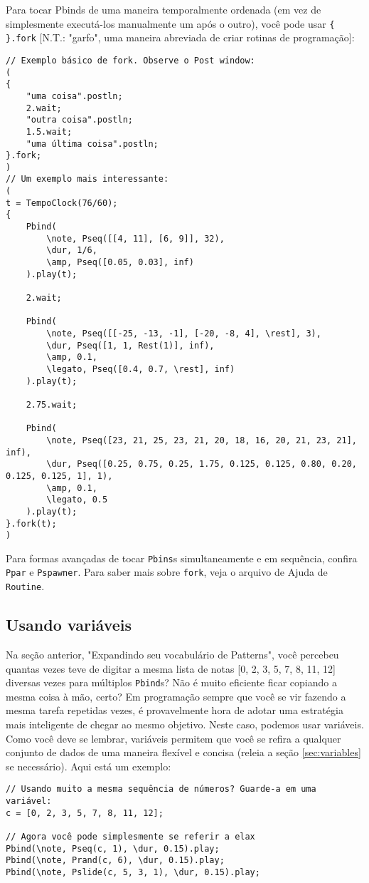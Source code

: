 Para tocar Pbinds de uma maneira temporalmente ordenada (em vez de simplesmente executá-los manualmente um após o outro), você pode usar \texttt{\{ \}.fork} [N.T.: "garfo", uma maneira abreviada de criar rotinas de programação]:

\begin{lstlisting}[style=SuperCollider-IDE, basicstyle=\scttfamily\footnotesize]
// Exemplo básico de fork. Observe o Post window:
( 
{
	"uma coisa".postln;
	2.wait;
	"outra coisa".postln;
	1.5.wait;
	"uma última coisa".postln;
}.fork;
)
// Um exemplo mais interessante:
(
t = TempoClock(76/60);
{
	Pbind(
		\note, Pseq([[4, 11], [6, 9]], 32),
		\dur, 1/6,
		\amp, Pseq([0.05, 0.03], inf)
	).play(t);
	
	2.wait;
	
	Pbind(
		\note, Pseq([[-25, -13, -1], [-20, -8, 4], \rest], 3),
		\dur, Pseq([1, 1, Rest(1)], inf),
		\amp, 0.1,
		\legato, Pseq([0.4, 0.7, \rest], inf)
	).play(t);

	2.75.wait;
	
	Pbind(
		\note, Pseq([23, 21, 25, 23, 21, 20, 18, 16, 20, 21, 23, 21], inf),
		\dur, Pseq([0.25, 0.75, 0.25, 1.75, 0.125, 0.125, 0.80, 0.20, 0.125, 0.125, 1], 1),
		\amp, 0.1,
		\legato, 0.5
	).play(t);
}.fork(t);
)
\end{lstlisting}
 
Para formas avançadas de tocar \texttt{Pbins}s simultaneamente e em sequência, confira \texttt{Ppar} e \texttt{Pspawner}. Para saber mais sobre \texttt{fork}, veja o arquivo de Ajuda de  \texttt{Routine}.

\subsection{Usando variáveis}

Na seção anterior, "Expandindo seu vocabulário de Patterns", você percebeu quantas vezes teve de digitar a mesma lista de notas [0, 2, 3, 5, 7, 8, 11, 12] diversas vezes para múltiplos \texttt{Pbind}s? Não é muito eficiente ficar copiando a mesma coisa à mão, certo? Em programação sempre que você se vir fazendo a mesma tarefa repetidas vezes, é provavelmente hora de adotar uma estratégia mais inteligente de chegar ao mesmo objetivo. Neste caso, podemos usar variáveis. Como você deve se lembrar, variáveis permitem que você se refira a qualquer conjunto de dados de uma maneira flexível e concisa (releia a seção \ref{sec:variables} se necessário). Aqui está um exemplo:

\begin{lstlisting}[style=SuperCollider-IDE, basicstyle=\scttfamily\footnotesize]
// Usando muito a mesma sequência de números? Guarde-a em uma variável:
c = [0, 2, 3, 5, 7, 8, 11, 12];

// Agora você pode simplesmente se referir a elax
Pbind(\note, Pseq(c, 1), \dur, 0.15).play;
Pbind(\note, Prand(c, 6), \dur, 0.15).play;
Pbind(\note, Pslide(c, 5, 3, 1), \dur, 0.15).play;
\end{lstlisting}
 

